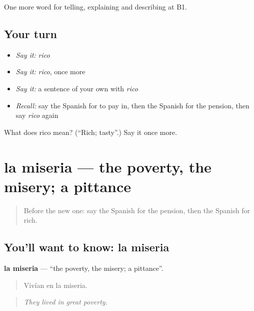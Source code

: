 \begin{grammarlens}[title={What you've built}]
One more word for telling, explaining and describing at B1.
\end{grammarlens}

\subsection*{Your turn}
\begin{itemize}
\raggedright
  \item \emph{Say it:} \emph{rico}
  \item \emph{Say it:} \emph{rico}, once more
  \item \emph{Say it:} a sentence of your own with \emph{rico}
  \item \emph{Recall:} say the Spanish for to pay in, then the Spanish for the pension, then say \emph{rico} again
\end{itemize}

\begin{tcolorbox}[breakable,colback=teal!4,colframe=teal!35!black,title={Before you move on}]
What does rico mean? (\textquotedblleft{}Rich; tasty\textquotedblright{}.) Say it once more.
\end{tcolorbox}
\section[la miseria]{la miseria — the poverty, the misery; a pittance}

\label{lesson:ES-C633-miseria}



\begin{quote}
Before the new one: say the Spanish for the pension, then the Spanish for rich.
\end{quote}

\subsection*{You'll want to know: la miseria}
\textbf{la miseria} — \textquotedblleft{}the poverty, the misery; a pittance\textquotedblright{}.

\begin{quote}
Vivían en la miseria.
\end{quote}

\begin{quote}
\emph{They lived in great poverty.}
\end{quote}

